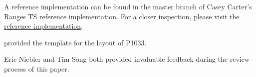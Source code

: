 \setcounter{chapter}{1}

A reference implementation can be found in the master branch of Casey Carter's Ranges TS reference
implementation. For a closer inspection, please visit
\href{https://github.com/CaseyCarter/cmcstl2/tree/master/include/stl2/detail/memory}{the reference implementation}.

\setcounter{chapter}{2}

 provided the template for the layout of
P1033.

Eric Niebler and Tim Song both provided invaluable feedback during the review process of this paper.
